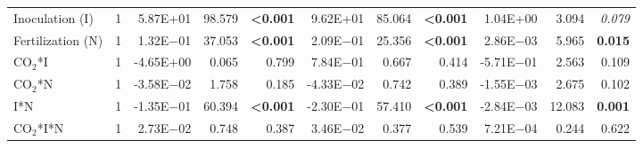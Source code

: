 \begin{landscape}
\begin{table}
{\begin{tabular}{p{3cm}p{0.5cm}p{1.75cm}p{1.5cm}p{1.5cm}p{1.75cm}p{1.5cm}p{1.5cm}p{1.75cm}p{1.5cm}p{1.5cm}}
            Inoculation (I) & \multicolumn{1}{r}{1}
            & \multicolumn{1}{r}{5.87E+01}      & \multicolumn{1}{r}{98.579}        & \multicolumn{1}{r}{\textbf{<0.001}}
            & \multicolumn{1}{r}{9.62E+01}      & \multicolumn{1}{r}{85.064}        & \multicolumn{1}{r}{\textbf{<0.001}}
            & \multicolumn{1}{r}{1.04E+00}      & \multicolumn{1}{r}{3.094}         & \multicolumn{1}{r}{\textit{ 0.079}} 
            \\

            Fertilization (N) & \multicolumn{1}{r}{1}
            & \multicolumn{1}{r}{1.32E$-$01}      & \multicolumn{1}{r}{37.053}        & \multicolumn{1}{r}{\textbf{<0.001}}
            & \multicolumn{1}{r}{2.09E$-$01}      & \multicolumn{1}{r}{25.356}        & \multicolumn{1}{r}{\textbf{<0.001}}
            & \multicolumn{1}{r}{2.86E$-$03}      & \multicolumn{1}{r}{5.965}         & \multicolumn{1}{r}{\textbf{ 0.015}} 
            \\

            CO$_2$*I & \multicolumn{1}{r}{1}
            & \multicolumn{1}{r}{-4.65E+00}     & \multicolumn{1}{r}{0.065}         & \multicolumn{1}{r}{0.799}
            & \multicolumn{1}{r}{ 7.84E$-$01}     & \multicolumn{1}{r}{0.667}         & \multicolumn{1}{r}{0.414}
            & \multicolumn{1}{r}{-5.71E$-$01}     & \multicolumn{1}{r}{2.563}         & \multicolumn{1}{r}{0.109} 
            \\

            CO$_2$*N & \multicolumn{1}{r}{1}
            & \multicolumn{1}{r}{-3.58E$-$02}     & \multicolumn{1}{r}{1.758}         & \multicolumn{1}{r}{0.185}
            & \multicolumn{1}{r}{-4.33E$-$02}     & \multicolumn{1}{r}{0.742}         & \multicolumn{1}{r}{0.389}
            & \multicolumn{1}{r}{-1.55E$-$03}     & \multicolumn{1}{r}{2.675}         & \multicolumn{1}{r}{0.102} 
            \\

            I*N & \multicolumn{1}{r}{1}
            & \multicolumn{1}{r}{-1.35E$-$01}     & \multicolumn{1}{r}{60.394}        & \multicolumn{1}{r}{\textbf{<0.001}}
            & \multicolumn{1}{r}{-2.30E$-$01}     & \multicolumn{1}{r}{57.410}        & \multicolumn{1}{r}{\textbf{<0.001}}
            & \multicolumn{1}{r}{-2.84E$-$03}     & \multicolumn{1}{r}{12.083}        & \multicolumn{1}{r}{\textbf{0.001}} 
            \\

            CO$_2$*I*N & \multicolumn{1}{r}{1}
            & \multicolumn{1}{r}{2.73E$-$02}      & \multicolumn{1}{r}{0.748}         & \multicolumn{1}{r}{0.387}
            & \multicolumn{1}{r}{3.46E$-$02}      & \multicolumn{1}{r}{0.377}         & \multicolumn{1}{r}{0.539}
            & \multicolumn{1}{r}{7.21E$-$04}      & \multicolumn{1}{r}{0.244}         & \multicolumn{1}{r}{0.622} 
            \\


\end{tabular}}
\end{table}
\end{landscape}
